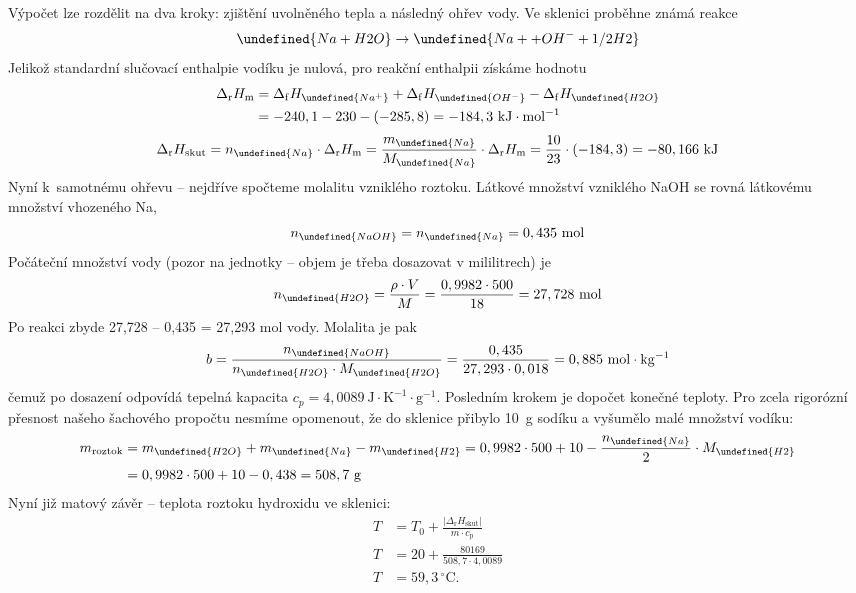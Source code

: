 \documentclass{book}
\let\ch\undefined
\begin{document}
Výpočet lze rozdělit na dva kroky: zjištění uvolněného tepla a následný
ohřev vody. Ve sklenici proběhne známá reakce 
\[
\ch{Na + H2O} \rightarrow \ch{Na+ + OH^{-} + 1/2 H2}
\]
Jelikož standardní slučovací enthalpie vodíku je nulová, pro reakční
enthalpii získáme hodnotu 
\begin{align*}
\Delta_{\mathrm{r}}H_{\mathrm{m}} & =\Delta_{\mathrm{f}}H_{\ch{Na^{+}}}+\Delta_{\mathrm{f}}H_{\ch{OH^{-}}}-\Delta_{\mathrm{f}}H_{\ch{H2O}}\\
 & =-240,1-230-(-285,8)=-184,3\mathrm{~kJ\cdot mol^{-1}}
\end{align*}
\[
\Delta_{\mathrm{r}}H_{\mathrm{skut}}=n_{\ch{Na}}\cdot\Delta_{\mathrm{r}}H_{\mathrm{m}}=\frac{m_{\ch{Na}}}{M_{\ch{Na}}}\cdot\Delta_{\mathrm{r}}H_{\mathrm{m}}=\frac{10}{23}\cdot(-184,3)=-80,166\mathrm{~kJ}
\]
Nyní k~samotnému ohřevu -- nejdříve spočteme molalitu vzniklého
roztoku. Látkové množství vzniklého NaOH se rovná látkovému množství
vhozeného Na, 
\[
n_{\ch{NaOH}}=n_{\ch{Na}}=0,435\mathrm{~mol}
\]
Počáteční množství vody (pozor na jednotky -- objem je třeba dosazovat
v mililitrech) je 
\[
n_{\ch{H2O}}=\frac{\rho\cdot V}{M}=\frac{0,9982\cdot500}{18}=27,728\mathrm{~mol}
\]
Po reakci zbyde 27,728 -- 0,435 = 27,293 mol vody. Molalita je pak
\[
b=\frac{n_{\ch{NaOH}}}{n_{\ch{H2O}}\cdot M_{\ch{H2O}}}=\frac{0,435}{27,293\cdot0,018}=0,885\mathrm{~mol\cdot kg^{-1}}
\]
čemuž po dosazení odpovídá tepelná kapacita $c_{p}=4,0089\mathrm{~J\cdot K^{-1}\cdot g^{-1}}$.
Posledním krokem je dopočet konečné teploty. Pro zcela rigorózní přesnost
našeho šachového propočtu nesmíme opomenout, že do sklenice přibylo
10~g sodíku a vyšumělo malé množství vodíku: 
\begin{align*}
m_{\mathrm{roztok}} & =m_{\ch{H2O}}+m_{\ch{Na}}-m_{\ch{H2}}=0,9982\cdot500+10-\frac{n_{\ch{Na}}}{2}\cdot M_{\ch{H2}}\\
 & =0,9982\cdot500+10-0,438=508,7\mathrm{~g}
\end{align*}
Nyní již matový závěr -- teplota roztoku hydroxidu ve sklenici: 
\begin{align*}
T & =T_{0}+\frac{|\Delta_{\mathrm{r}}H_{\mathrm{skut}}|}{m\cdot c_{\mathrm{p}}}\\
T & =20+\frac{80169}{508,7\cdot4,0089}\\
T & =59,3\,{^{\circ}}\mathrm{C}.
\end{align*}
\end{document}
